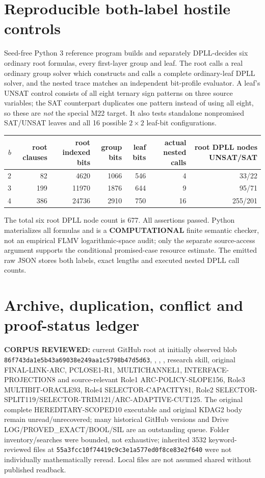 \documentclass[11pt]{article}
\begin{document}
\section{Reproducible both-label hostile controls}
Seed-free Python 3 reference program builds and separately DPLL-decides six ordinary root formulas, every first-layer group and leaf. The root calls a real ordinary group solver which constructs and calls a complete ordinary-leaf DPLL solver, and the nested trace matches an independent bit-profile evaluator. A leaf's UNSAT control consists of all eight ternary sign patterns on three source variables; the SAT counterpart duplicates one pattern instead of using all eight, so these are \emph{not} the special M22 target. It also tests standalone nonpromised SAT/UNSAT leaves and all 16 possible $2\times2$ leaf-bit configurations.
\begin{center}\small
\begin{tabular}{rrrrrrr}\toprule
$b$ & root clauses & root indexed bits & group bits & leaf bits & actual nested calls & root DPLL nodes UNSAT/SAT\\\midrule
2&82&4620&1066&546&4&33/22\\
3&199&11970&1876&644&9&95/71\\
4&386&24736&2910&750&16&255/201\\\bottomrule
\end{tabular}
\end{center}
The total six root DPLL node count is 677. All assertions passed. Python materializes all formulas and is a \textbf{COMPUTATIONAL} finite semantic checker, not an empirical FLMV logarithmic-space audit; only the separate source-access argument supports the conditional promised-case resource estimate. The emitted raw JSON stores both labels, exact lengths and executed nested DPLL call counts.

\section{Archive, duplication, conflict and proof-status ledger}
\textbf{CORPUS REVIEWED:} current GitHub root  at initially observed blob \texttt{86f743da1e5b43a69038e249aa1c5798b47d5d63}, , , , research skill, original FINAL-LINK-ARC, PCLOSE1-R1, MULTICHANNEL1, INTERFACE-PROJECTION8 and source-relevant Role1 ARC-POLICY-SLOPE156, Role3 MULTIBIT-ORACLE93, Role4 SELECTOR-CAPACITY81, Role2 SELECTOR-SPLIT119/SELECTOR-TRIM121/ARC-ADAPTIVE-CUT125. The original complete HEREDITARY-SCOPED10 executable and original KDAG2 body remain unread/unrecovered; many historical GitHub versions and Drive LOG/PROVED\_EXACT/BOOL/SIL are an outstanding queue. Folder inventory/searches were bounded, not exhaustive; inherited 3532 keyword-reviewed files at \texttt{55a3fcc10f74419c9c3e1a577ed0f8ce83e2f640} were not individually mathematically reread. Local files are not assumed shared without published readback.
\end{document}
